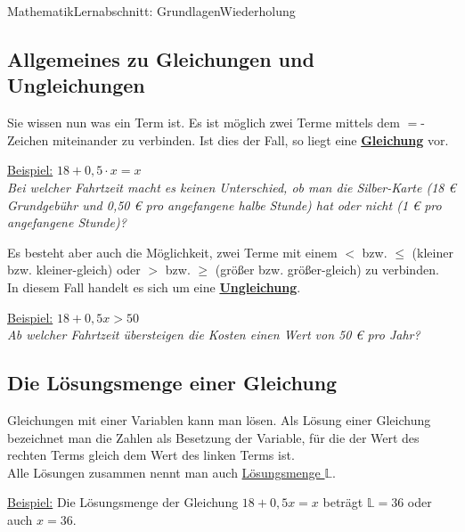 \documentclass[11pt,twocolumn,oneside,openany,headings=optiontotoc,11pt,numbers=noenddot]{article}
\begin{document}
\begin{worksheet}{Mathematik}{Lernabschnitt: Grundlagen}{Wiederholung}
		\subsection{Allgemeines zu Gleichungen und Ungleichungen}
		Sie wissen nun was ein Term ist. Es ist möglich zwei Terme mittels dem \glqq{}\(=\)\grqq{}-Zeichen miteinander zu verbinden. Ist dies der Fall, so liegt eine \underline{\textbf{Gleichung}} vor.\\
		\par\bigskip\noindent
		\underline{Beispiel:} \(18 + 0,5\cdot{}x = x\)\\
		\glqq{}\textit{Bei welcher Fahrtzeit macht es keinen Unterschied, ob man die Silber-Karte (18 \euro{} Grundgebühr und 0,50 \euro{} pro angefangene halbe Stunde) hat oder nicht (1 \euro{} pro angefangene Stunde)?}\grqq{}\\
		\par\bigskip\noindent
		Es besteht aber auch die Möglichkeit, zwei Terme mit einem \glqq{}\(<\)\grqq{} bzw. \glqq{}\(\leq\)\grqq{} (\glqq{}kleiner\grqq{} bzw. \glqq{}kleiner-gleich\grqq{}) oder \glqq{}\(>\)\grqq{} bzw. \glqq{}\(\geq\)\grqq{} (\glqq{}größer\grqq{} bzw. \glqq{}größer-gleich\grqq{}) zu verbinden.\\
		In diesem Fall handelt es sich um eine \underline{\textbf{Ungleichung}}.\\
		\par\bigskip\noindent
		\underline{Beispiel:} \(18 + 0,5x > 50\)\\
		\glqq{}\textit{Ab welcher Fahrtzeit übersteigen die Kosten einen Wert von 50 \euro{} pro Jahr?}\grqq{}\\
		\subsection{Die Lösungsmenge einer Gleichung}
		Gleichungen mit einer Variablen kann man lösen. Als Lösung einer Gleichung bezeichnet man die Zahlen als Besetzung der Variable, für die der Wert des rechten Terms gleich dem Wert des linken Terms ist.\\
		Alle Lösungen zusammen nennt man auch \underline{Lösungsmenge \(\mathbb{L}\)}.\\
		\par\bigskip\noindent
		\underline{Beispiel:} Die Lösungsmenge der Gleichung \(18 + 0,5x = x\) beträgt \(\mathbb{L} = {36}\) oder auch \(x=36\).

\end{worksheet}
\end{document}
